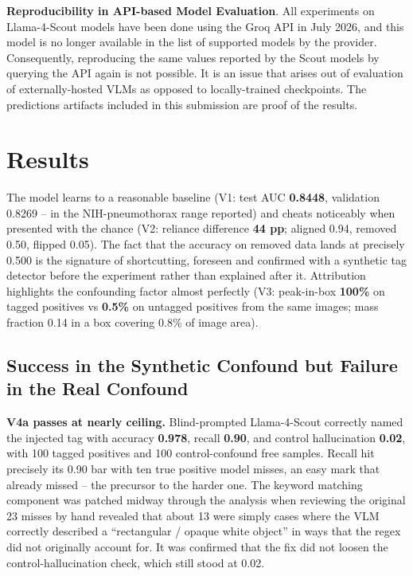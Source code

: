 \documentclass{ieeeaccess}
\begin{document}
\textbf{Reproducibility in API-based Model Evaluation}. All experiments on Llama-4-Scout models have been done using the Groq API in July 2026, and this model is no longer available in the list of supported models by the provider. Consequently, reproducing the same values reported by the Scout models by querying the API again is not possible. It is an issue that arises out of evaluation of externally-hosted VLMs as opposed to locally-trained checkpoints. The predictions artifacts included in this submission are proof of the results.

\section{Results}
The model learns to a reasonable baseline (V1: test AUC \textbf{0.8448}, validation 0.8269 -- in the NIH-pneumothorax range reported) and cheats noticeably when presented with the chance (V2: reliance difference \textbf{44 pp}; aligned 0.94, removed 0.50, flipped 0.05). The fact that the accuracy on removed data lands at precisely 0.500 is the signature of shortcutting, foreseen and confirmed with a synthetic tag detector before the experiment rather than explained after it. Attribution highlights the confounding factor almost perfectly (V3: peak-in-box \textbf{100\%} on tagged positives vs \textbf{0.5\%} on untagged positives from the same images; mass fraction 0.14 in a box covering 0.8\% of image area).

\subsection{Success in the Synthetic Confound but Failure in the Real Confound}
\textbf{V4a passes at nearly ceiling.} Blind-prompted Llama-4-Scout correctly named the injected tag with accuracy \textbf{0.978}, recall \textbf{0.90}, and control hallucination \textbf{0.02}, with 100 tagged positives and 100 control-confound free samples. Recall hit precisely its 0.90 bar with ten true positive model misses, an easy mark that already missed -- the precursor to the harder one. The keyword matching component was patched midway through the analysis when reviewing the original 23 misses by hand revealed that about 13 were simply cases where the VLM correctly described a ``rectangular / opaque white object'' in ways that the regex did not originally account for. It was confirmed that the fix did not loosen the control-hallucination check, which still stood at 0.02.
\end{document}
